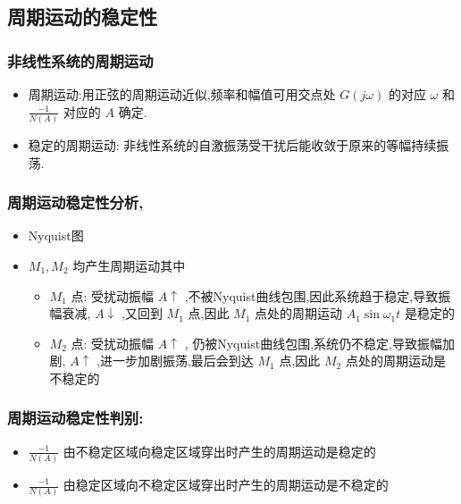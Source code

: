 \documentclass[table]{article}
\begin{document}
\subsection{周期运动的稳定性}
\label{sec-2-4}
\begin{frame}
\frametitle{非线性系统的周期运动}
\label{sec-2-4-1}

\begin{itemize}
\item 周期运动:用正弦的周期运动近似,频率和幅值可用交点处  $G(j\omega)$ 的对应  $\omega$  和  $\frac{-1}{N(A)}$  对应的  $A$  确定.
\item <2-> 稳定的周期运动: 非线性系统的自激振荡受干扰后能收敛于原来的等幅持续振荡.
\end{itemize}
\end{frame}
\begin{frame}
\frametitle{周期运动稳定性分析,}
\label{sec-2-4-2}
\begin{itemize}

\item Nyquist图
\label{sec-2-4-2-1}%


\item $M_1,M_2$  均产生周期运动其中
\label{sec-2-4-2-2}%
\begin{itemize}
\item <2->$M_1$  点: 受扰动振幅  $A\uparrow$  ,不被Nyquist曲线包围,因此系统趋于稳定,导致振幅衰减, $A\downarrow$ ,又回到  $M_1$  点,因此  $M_1$  点处的周期运动  $A_1\sin\omega_1 t$  是稳定的
\item <3->$M_2$  点: 受扰动振幅  $A\uparrow$  , 仍被Nyquist曲线包围,系统仍不稳定,导致振幅加剧, $A\uparrow$ ,进一步加剧振荡,最后会到达  $M_1$  点,因此  $M_2$  点处的周期运动是不稳定的
\end{itemize}

\end{itemize} %
\end{frame}
\begin{frame}
\frametitle{周期运动稳定性判别:}
\label{sec-2-4-3}

\begin{itemize}
\item $\frac{-1}{N(A)}$  由不稳定区域向稳定区域穿出时产生的周期运动是稳定的
\item <2->$\frac{-1}{N(A)}$  由稳定区域向不稳定区域穿出时产生的周期运动是不稳定的
\end{itemize}
\end{frame}
\end{document}
